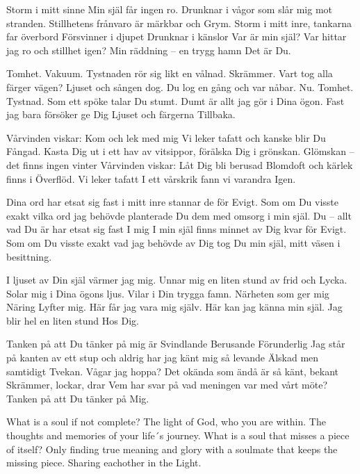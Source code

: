 \startpoem
Storm i mitt sinne
Min själ får ingen ro.
Drunknar i vågor som slår mig mot stranden.
Stillhetens frånvaro är märkbar och
Grym.
Storm i mitt inre,
tankarna far överbord
Försvinner i djupet
Drunknar i känslor
Var är min själ?
Var hittar jag ro och stillhet igen?
Min räddning – en trygg hamn
Det är Du.
\stoppoem

\startpoem
Tomhet. Vakuum.
Tystnaden rör sig likt en vålnad.
Skrämmer. 
Vart tog alla färger vägen?
Ljuset och sången dog.
Du log en gång och var nåbar.
Nu. 
Tomhet. Tystnad.
Som ett spöke talar Du stumt.
Dumt är allt jag gör i Dina ögon.
Fast jag bara försöker ge Dig
Ljuset och färgerna
Tillbaka.
\stoppoem

\startpoem
Vårvinden viskar:
Kom och lek med mig
Vi leker tafatt och kanske blir Du
Fångad.
Kasta Dig ut i ett hav av vitsippor,
förälska Dig i grönskan.
Glömskan – det finns ingen vinter
Vårvinden viskar:
Låt Dig bli berusad
Blomdoft och kärlek finns i 
Överflöd.
Vi leker tafatt
I ett vårskrik fann vi varandra
Igen.
\stoppoem

\startpoem
Dina ord har etsat sig fast
i mitt inre stannar de för
Evigt.
Som om Du visste exakt vilka ord
jag behövde
planterade Du dem med omsorg
i min själ.
Du – allt vad Du är har etsat sig fast
I mig
I min själ finns minnet av Dig kvar för
Evigt.
Som om Du visste
exakt vad jag behövde av Dig
tog Du min själ, mitt väsen i besittning.
\stoppoem

\startpoem
I ljuset av Din själ
värmer jag mig.
Unnar mig en liten stund av frid och
Lycka.
Solar mig i Dina ögons ljus.
Vilar i Din trygga famn.
Närheten som ger mig 
Näring
Lyfter mig.
Här får jag vara mig själv.
Här kan jag känna min själ.
Jag blir hel en liten stund
Hos Dig.
\stoppoem

\startpoem
Tanken på att Du tänker på mig är 
Svindlande
Berusande
Förunderlig
Jag står på kanten av ett stup 
och aldrig har jag känt mig så levande
Älskad men samtidigt
Tvekan.
Vågar jag hoppa?
Det okända som ändå är så känt, bekant
Skrämmer, lockar, drar
Vem har svar på vad meningen var 
med vårt möte?
Tanken på att Du tänker på
Mig.
\stoppoem

\startpoem
What is a soul if not complete?
The light of God, who you are within.
The thoughts and memories of
your life´s journey.
What is a soul that misses a piece of itself?
Only finding true meaning and glory
with a soulmate that keeps the missing piece.
Sharing eachother in the 
Light.
\stoppoem

